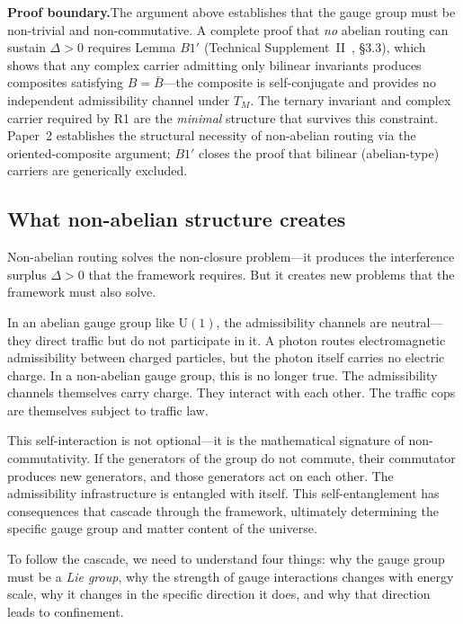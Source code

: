 \documentclass[11pt]{article}
\newcommand{\U}{\mathrm{U}}
\begin{document}
\smallskip
\noindent\textbf{Proof boundary.}\quad The argument above establishes that the gauge group must be non-trivial and non-commutative.  A complete proof that \emph{no} abelian routing can sustain $\Delta > 0$ requires Lemma $B1'$ (Technical Supplement~II~\cite{BrookeP2FoundSupplement}, \S3.3), which shows that any complex carrier admitting only bilinear invariants produces composites satisfying $B = \bar{B}$---the composite is self-conjugate and provides no independent admissibility channel under $T_M$.  The ternary invariant and complex carrier required by R1 are the \emph{minimal} structure that survives this constraint.  Paper~2 establishes the structural necessity of non-abelian routing via the oriented-composite argument; $B1'$ closes the proof that bilinear (abelian-type) carriers are generically excluded.


\subsection{What non-abelian structure creates}

Non-abelian routing solves the non-closure problem---it produces the interference surplus $\Delta > 0$ that the framework requires.  But it creates new problems that the framework must also solve.

In an abelian gauge group like $\U(1)$, the admissibility channels are neutral---they direct traffic but do not participate in it.  A photon routes electromagnetic admissibility between charged particles, but the photon itself carries no electric charge.  In a non-abelian gauge group, this is no longer true.  The admissibility channels themselves carry charge.  They interact with each other.  The traffic cops are themselves subject to traffic law.

This self-interaction is not optional---it is the mathematical signature of non-commutativity.  If the generators of the group do not commute, their commutator produces new generators, and those generators act on each other.  The admissibility infrastructure is entangled with itself.  This self-entanglement has consequences that cascade through the framework, ultimately determining the specific gauge group and matter content of the universe.

To follow the cascade, we need to understand four things: why the gauge group must be a \emph{Lie group}, why the strength of gauge interactions changes with energy scale, why it changes in the specific direction it does, and why that direction leads to confinement.
\end{document}
